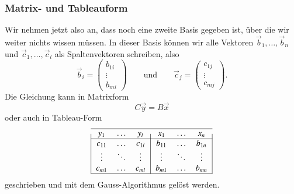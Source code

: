 \subsubsection{Matrix- und Tableauform}
Wir nehmen jetzt also an, dass noch eine zweite Basis gegeben ist,
über die wir weiter nichts wissen müssen.
In dieser Basis können wir alle Vektoren
$\vec{b}_1,\dots,\vec{b}_n$ und $\vec{c}_1,\dots,\vec{c}_l$
als Spaltenvektoren schreiben, also
\[
\vec{b}_i = \begin{pmatrix}b_{1i}\\\vdots\\b_{mi}\end{pmatrix}
\qquad\text{und}\qquad
\vec{c}_j = \begin{pmatrix}c_{1j}\\\vdots\\c_{mj}\end{pmatrix}.
\]
Die Gleichung
\label{skript:affin:basistransformation-ansatz}
kann in Matrixform
\begin{equation}
C\vec{y} = B\vec{x}
\label{skript:affin:basistransformation-matrix}
\end{equation}
oder auch
in Tableau-Form
\begin{equation}
\begin{tabular}{|>{$}c<{$}>{$}c<{$}>{$}c<{$}|>{$}c<{$}>{$}c<{$}>{$}c<{$}|}
\hline
   y_1&\dots &   y_l&   x_1&\dots &   x_n\\
\hline
c_{11}&\dots &c_{1l}&b_{11}&\dots &b_{1n}\\
\vdots&\ddots&\vdots&\vdots&\ddots&\vdots\\
c_{m1}&\dots &c_{ml}&b_{m1}&\dots &b_{mn}\\
\hline
\end{tabular}
\label{skript:affin:basistransformation-tableau}
\end{equation}
geschrieben und mit dem Gauss-Algorithmus gelöst werden.

